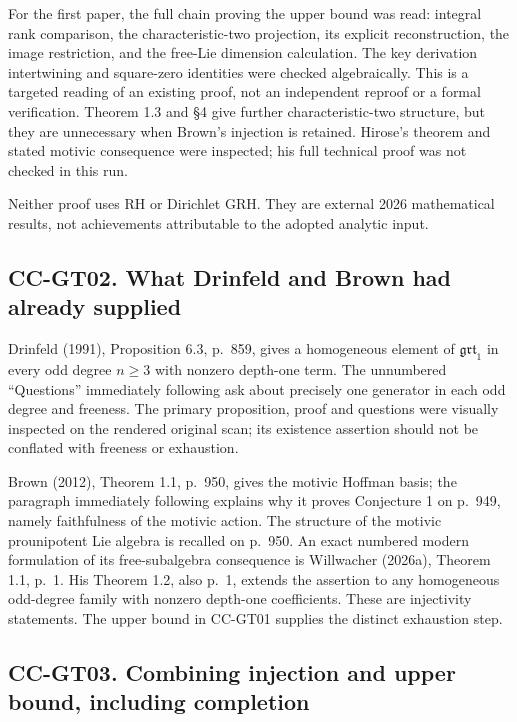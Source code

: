 For the first paper, the full chain proving the upper bound was read:
integral rank comparison, the characteristic-two projection, its
explicit reconstruction, the image restriction, and the free-Lie
dimension calculation. The key derivation intertwining and square-zero
identities were checked algebraically. This is a targeted reading of an
existing proof, not an independent reproof or a formal verification.
Theorem 1.3 and §4 give further characteristic-two structure, but they
are unnecessary when Brown's injection is retained. Hirose's theorem and
stated motivic consequence were inspected; his full technical proof was
not checked in this run.

Neither proof uses RH or Dirichlet GRH. They are external 2026
mathematical results, not achievements attributable to the adopted
analytic input.

\subsection{CC-GT02. What Drinfeld and Brown had already
supplied}\label{cc-gt02.-what-drinfeld-and-brown-had-already-supplied}

Drinfeld (1991), Proposition 6.3, p.~859, gives a homogeneous element of
\(\mathfrak{grt}_1\) in every odd degree \(n\ge3\) with nonzero
depth-one term. The unnumbered ``Questions'' immediately following ask
about precisely one generator in each odd degree and freeness. The
primary proposition, proof and questions were visually inspected on the
rendered original scan; its existence assertion should not be conflated
with freeness or exhaustion.

Brown (2012), Theorem 1.1, p.~950, gives the motivic Hoffman basis; the
paragraph immediately following explains why it proves Conjecture 1 on
p.~949, namely faithfulness of the motivic action. The structure of the
motivic prounipotent Lie algebra is recalled on p.~950. An exact
numbered modern formulation of its free-subalgebra consequence is
Willwacher (2026a), Theorem 1.1, p.~1. His Theorem 1.2, also p.~1,
extends the assertion to any homogeneous odd-degree family with nonzero
depth-one coefficients. These are injectivity statements. The upper
bound in CC-GT01 supplies the distinct exhaustion step.

\subsection{CC-GT03. Combining injection and upper bound, including
completion}\label{cc-gt03.-combining-injection-and-upper-bound-including-completion}

